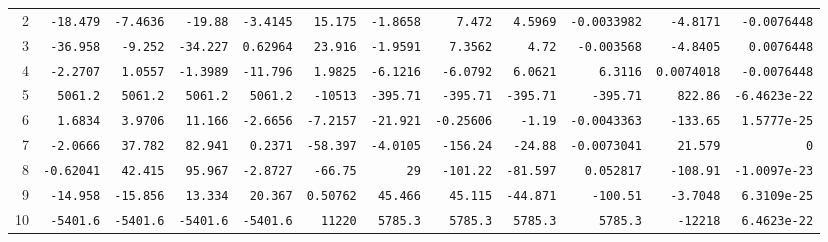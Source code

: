 \begin{landscape}
\begin{tabular}{rrrrrrrrrrrr}
2 & \texttt{-18.479} & \texttt{-7.4636} & \texttt{-19.88} & \texttt{-3.4145} & \texttt{15.175} & \texttt{-1.8658} & \texttt{7.472} & \texttt{4.5969} & \texttt{-0.0033982} & \texttt{-4.8171} & \texttt{-0.0076448} \\

3 & \texttt{-36.958} & \texttt{-9.252} & \texttt{-34.227} & \texttt{0.62964} & \texttt{23.916} & \texttt{-1.9591} & \texttt{7.3562} & \texttt{4.72} & \texttt{-0.003568} & \texttt{-4.8405} & \texttt{0.0076448} \\

4 & \texttt{-2.2707} & \texttt{1.0557} & \texttt{-1.3989} & \texttt{-11.796} & \texttt{1.9825} & \texttt{-6.1216} & \texttt{-6.0792} & \texttt{6.0621} & \texttt{6.3116} & \texttt{0.0074018} & \texttt{-0.0076448} \\

5 & \texttt{5061.2} & \texttt{5061.2} & \texttt{5061.2} & \texttt{5061.2} & \texttt{-10513} & \texttt{-395.71} & \texttt{-395.71} & \texttt{-395.71} & \texttt{-395.71} & \texttt{822.86} & \texttt{-6.4623e-22} \\

6 & \texttt{1.6834} & \texttt{3.9706} & \texttt{11.166} & \texttt{-2.6656} & \texttt{-7.2157} & \texttt{-21.921} & \texttt{-0.25606} & \texttt{-1.19} & \texttt{-0.0043363} & \texttt{-133.65} & \texttt{1.5777e-25} \\

7 & \texttt{-2.0666} & \texttt{37.782} & \texttt{82.941} & \texttt{0.2371} & \texttt{-58.397} & \texttt{-4.0105} & \texttt{-156.24} & \texttt{-24.88} & \texttt{-0.0073041} & \texttt{21.579} & \texttt{0} \\

8 & \texttt{-0.62041} & \texttt{42.415} & \texttt{95.967} & \texttt{-2.8727} & \texttt{-66.75} & \texttt{29} & \texttt{-101.22} & \texttt{-81.597} & \texttt{0.052817} & \texttt{-108.91} & \texttt{-1.0097e-23} \\

9 & \texttt{-14.958} & \texttt{-15.856} & \texttt{13.334} & \texttt{20.367} & \texttt{0.50762} & \texttt{45.466} & \texttt{45.115} & \texttt{-44.871} & \texttt{-100.51} & \texttt{-3.7048} & \texttt{6.3109e-25} \\

10 & \texttt{-5401.6} & \texttt{-5401.6} & \texttt{-5401.6} & \texttt{-5401.6} & \texttt{11220} & \texttt{5785.3} & \texttt{5785.3} & \texttt{5785.3} & \texttt{5785.3} & \texttt{-12218} & \texttt{6.4623e-22} \\


\end{tabular}
\end{landscape}
